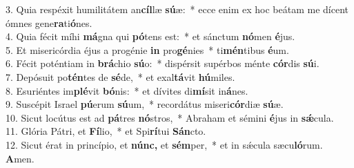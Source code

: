 3. Quia respéxit humilitátem an\textbf{cíl}læ \textbf{sú}æ: * ecce enim ex hoc beátam me dícent ómnes gene\textbf{ra}ti\textbf{ó}nes.\\
4. Quia fécit míhi \textbf{má}gna qui \textbf{pó}tens est: * et sánctum \textbf{nó}men \textbf{é}jus.\\
5. Et misericórdia éjus a progénie \textbf{in} pro\textbf{gé}nies * ti\textbf{mén}tibus \textbf{é}um.\\
6. Fécit poténtiam in \textbf{brá}chio \textbf{sú}o: * dispérsit supérbos ménte \textbf{cór}dis \textbf{sú}i.\\
7. Depósuit po\textbf{tén}tes de \textbf{sé}de, * et exal\textbf{tá}vit \textbf{hú}miles.\\
8. Esuriéntes im\textbf{plé}vit \textbf{bó}nis: * et dívites di\textbf{mí}sit in\textbf{á}nes.\\
9. Suscépit Israel \textbf{pú}erum \textbf{sú}um, * recordátus miseri\textbf{cór}diæ \textbf{sú}æ.\\
10. Sicut locútus est ad \textbf{pá}tres \textbf{nó}stros, * Abraham et sémini \textbf{é}jus in \textbf{sǽ}cula.\\
11. Glória Pátri, et \textbf{Fí}lio, * et Spi\textbf{rí}tui \textbf{Sán}cto.\\
12. Sicut érat in princípio, et \textbf{núnc,} et \textbf{sém}per, * et in sǽcula sæcu\textbf{ló}rum. \textbf{A}men.
